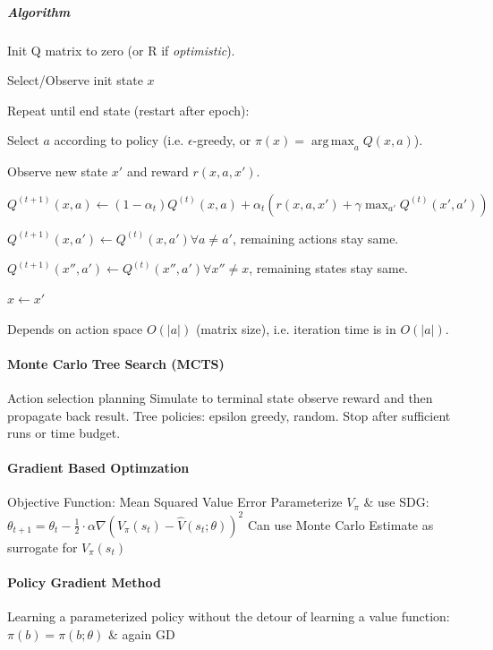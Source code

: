 \documentclass[a4paper, 10pt]{scrartcl}
\DeclareMathOperator*{\argmax}{arg\,max}
\begin{document}
\begin{multicols*}{3}
\subparagraph{Algorithm} Init Q matrix to zero (or R if \emph{optimistic}).
\begin{compactitem}
	\item Select/Observe init state $x$
	\item Repeat until end state (restart after epoch):
	\item Select $a$ according to policy (i.e. $\epsilon$-greedy, or $\pi(x) = \argmax_a Q(x, a)$).
	\item Observe new state $x'$ and reward $r(x,a,x')$.
	\item $Q^{(t+1)}(x, a) \leftarrow (1-\alpha_t)Q^{(t)}(x, a) + \alpha_t(r(x,a,x') + \gamma \max_{a'}Q^{(t)}(x',a'))$
	\item $Q^{(t+1)}(x, a') \leftarrow Q^{(t)}(x, a') \forall a \neq a'$, remaining actions stay same.
	\item $Q^{(t+1)}(x'', a') \leftarrow Q^{(t)}(x'', a') \forall x'' \neq x$, remaining states stay same.
	\item $x \leftarrow x'$
\end{compactitem}

Depends on action space $O(|a|)$ (matrix size), i.e. iteration time is in $O(|a|)$.

\paragraph{Monte Carlo Tree Search (MCTS)}
Action selection planning
Simulate to terminal state observe reward and then propagate back result. Tree policies: epsilon greedy, random. Stop after sufficient runs or time budget.

\paragraph{Gradient Based Optimzation}
Objective Function: Mean Squared Value Error
Parameterize $V_\pi$ \& use SDG:
$\theta_{t+1} = \theta_{t} - \frac{1}{2}\cdot\alpha\nabla(V_\pi(s_t) - \hat{V}(s_t; \theta ))^2$
Can use Monte Carlo Estimate as surrogate for $V_\pi(s_t)$

\paragraph{Policy Gradient Method}
Learning a parameterized policy without the detour of learning a value function: $\pi(b) = \pi(b;\theta)$ \& again GD

\end{multicols*}
\end{document}
